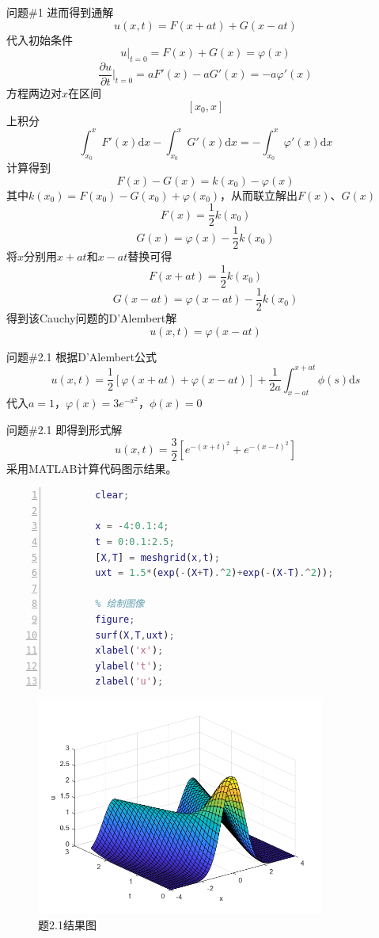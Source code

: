 \documentclass[12pt]{ctexart}
\begin{document}
    \begin{problem}{问题\#1}
        进而得到通解
        $$
        u(x,t)=F(x+at)+G(x-at)
        $$
        代入初始条件
        $$
        u|_{t=0}=F(x)+G(x)=\varphi(x)
        $$
        $$
        \dfrac{\partial u}{\partial t}|_{t=0}=aF'(x)-aG'(x)=-a\varphi'(x)
        $$
        方程两边对$x$在区间$$[x_0,x]$$上积分
        $$
        \int^{x}_{x_0}F'(x)\text{d}x-\int^{x}_{x_0}G'(x)\text{d}x=-\int^{x}_{x_0}\varphi'(x)\text{d}x
        $$
        计算得到
        $$
        F(x)-G(x)=k(x_0)-\varphi(x)
        $$
        其中$k(x_0)=F(x_0)-G(x_0)+\varphi(x_0)$，从而联立解出$F(x)$、$G(x)$
        $$
        F(x)=\dfrac{1}{2}k(x_0)
        $$
        $$
        G(x)=\varphi(x)-\dfrac{1}{2}k(x_0)
        $$
        将$x$分别用$x+at$和$x-at$替换可得
        $$
        F(x+at)=\dfrac{1}{2}k(x_0)
        $$
        $$
        G(x-at)=\varphi(x-at)-\dfrac{1}{2}k(x_0)
        $$
        得到该Cauchy问题的D'Alembert解
        $$
        u(x,t)=\varphi(x-at)
        $$
    \end{problem}
    \begin{problem}{问题\#2.1}
        根据D'Alembert公式
        $$
        u(x,t)=\dfrac{1}{2}[\varphi(x+at)+\varphi(x-at)]+\dfrac{1}{2a}\int^{x+at}_{x-at}\phi(s)\text{d}s
        $$
        代入$a=1$，$\varphi(x)=3e^{-x^2}$，$\phi(x)=0$  
    \end{problem}
    \begin{problem}{问题\#2.1}
        即得到形式解
        $$
        u(x,t)=\dfrac{3}{2}\left[e^{-(x+t)^2}+e^{-(x-t)^2}\right]
        $$
        采用MATLAB计算代码图示结果。
    \end{problem}
    \begin{lstlisting}[language = Matlab,title={test7\_2\_1.m},  numbers=left, 
        numberstyle=\tiny,keywordstyle=\color{blue!70},
        commentstyle=\color{red!50!green!50!blue!50},frame=shadowbox,
        rulesepcolor=\color{red!20!green!20!blue!20},basicstyle=\ttfamily]
        % 问题2.1达朗贝尔解图示
        clear;

        x = -4:0.1:4;
        t = 0:0.1:2.5;
        [X,T] = meshgrid(x,t);
        uxt = 1.5*(exp(-(X+T).^2)+exp(-(X-T).^2));

        % 绘制图像
        figure;
        surf(X,T,uxt);
        xlabel('x');
        ylabel('t');
        zlabel('u');
    \end{lstlisting}
    \begin{figure}[htbp]
        \small
        \centering
        \includegraphics[width=9.5cm]{fig1.png}
        \caption{题2.1结果图} \label{Fig:aa}
    \end{figure}
\end{document}
